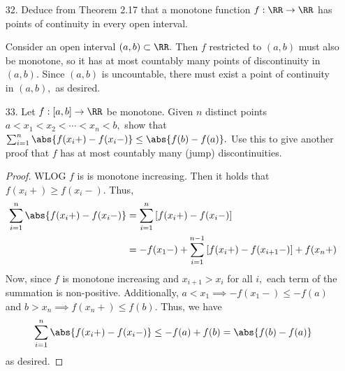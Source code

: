 \documentclass{article}
\begin{document}
\begin{itemize}
	\item[32.] Deduce from Theorem 2.17 that a monotone function $f:\RR\to\RR$ has points of continuity in every open interval.
		\begin{soln}
			Consider an open interval $(a, b)\subset \RR.$ Then $f$ restricted to $(a, b)$ must also be monotone, so it has at most countably many points of discontinuity in $(a, b).$ Since $(a, b)$ is uncountable, there must exist a point of continuity in $(a, b),$ as desired.
		\end{soln}

	\item[33.] Let $f:[a, b]\to \RR$ be monotone. Given $n$ distinct points $a<x_1<x_2<\cdots<x_n<b,$ show that $\sum_{i=1}^{n} \abs{f(x_i+)-f(x_i-)}\le \abs{f(b)-f(a)}.$ Use this to give another proof that $f$ has at most countably many (jump) discontinuities. 
		\begin{proof}
			WLOG $f$ is is monotone increasing. Then it holds that $f(x_i+)\ge f(x_i-).$ Thus,
			\begin{align*}
				\sum_{i=1}^{n} \abs{f(x_i+)-f(x_i-)} &= \sum_{i=1}^{n} \left[ f(x_i+)-f(x_i-) \right] \\
				&= -f(x_1-) + \sum_{i=1}^{n-1} \left[ f(x_i+)-f(x_{i+1}-) \right] + f(x_n+)
			\end{align*}
			Now, since $f$ is monotone increasing and $x_{i+1}>x_i$ for all $i,$ each term of the summation is non-positive. Additionally, $a<x_1\implies -f(x_1-)\le -f(a)$ and $b>x_n\implies f(x_n+)\le f(b).$ Thus, we have
			\begin{align*}
				\sum_{i=1}^{n}\abs{f(x_i+)-f(x_i-)} \le -f(a) + f(b) = \abs{f(b)-f(a)}
			\end{align*}
			as desired.
		\end{proof}
		
\end{itemize}
\end{document}
